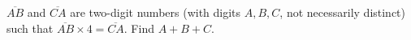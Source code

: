 $\overline{AB}$ and $\overline{CA}$ are two-digit numbers (with digits $A,B,C$, not necessarily distinct) such that $\overline{AB}\times4=\overline{CA}$. Find $A+B+C$.
